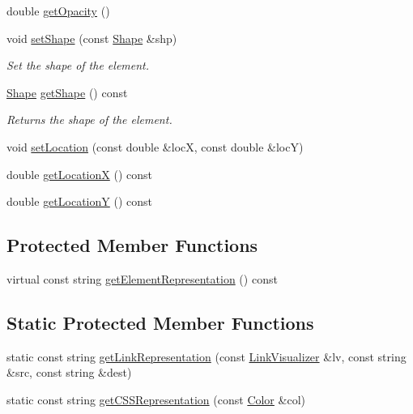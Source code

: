 \begin{DoxyCompactItemize}
\item 
double \hyperlink{classbridges_1_1datastructure_1_1_element_acf14bfc12da42565b237a7bd79bd36c2}{get\+Opacity} ()
\item 
void \hyperlink{classbridges_1_1datastructure_1_1_element_a1ef398bf1027244a624575e58a569ed9}{set\+Shape} (const \hyperlink{namespacebridges_1_1datastructure_a3408f5f44d9c6062e5f3adb7e1bbb7f0}{Shape} \&shp)
\begin{DoxyCompactList}\small\item\em Set the shape of the element. \end{DoxyCompactList}\item 
\hyperlink{namespacebridges_1_1datastructure_a3408f5f44d9c6062e5f3adb7e1bbb7f0}{Shape} \hyperlink{classbridges_1_1datastructure_1_1_element_acb8680aa406733d36411fd189017706c}{get\+Shape} () const
\begin{DoxyCompactList}\small\item\em Returns the shape of the element. \end{DoxyCompactList}\item 
void \hyperlink{classbridges_1_1datastructure_1_1_element_af3af017c9d6efcbc2124d0231b57e7a6}{set\+Location} (const double \&locX, const double \&locY)
\item 
double \hyperlink{classbridges_1_1datastructure_1_1_element_a471f2f69147deb0f514bb9720e0e18ea}{get\+LocationX} () const
\item 
double \hyperlink{classbridges_1_1datastructure_1_1_element_a6394039086bc1f27f2e6adf73294a74b}{get\+LocationY} () const
\end{DoxyCompactItemize}
\subsection*{Protected Member Functions}
\begin{DoxyCompactItemize}
\item 
virtual const string \hyperlink{classbridges_1_1datastructure_1_1_element_a285fc51d6dfcb8bff2d72f7e4addfe6d}{get\+Element\+Representation} () const
\end{DoxyCompactItemize}
\subsection*{Static Protected Member Functions}
\begin{DoxyCompactItemize}
\item 
static const string \hyperlink{classbridges_1_1datastructure_1_1_element_a0d43c0aaa96192b49dfc0a499d63a325}{get\+Link\+Representation} (const \hyperlink{classbridges_1_1datastructure_1_1_link_visualizer}{Link\+Visualizer} \&lv, const string \&src, const string \&dest)
\item 
static const string \hyperlink{classbridges_1_1datastructure_1_1_element_afc6de63b836064024721d72b7ffa52bf}{get\+C\+S\+S\+Representation} (const \hyperlink{classbridges_1_1datastructure_1_1_color}{Color} \&col)
\end{DoxyCompactItemize}
